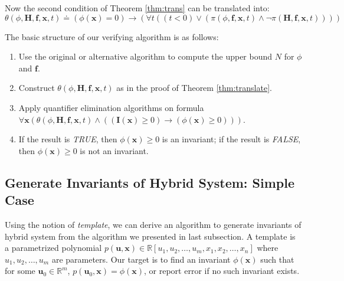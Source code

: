 \documentclass{article}
\begin{document}
\begin{Proof}
Now the second condition of Theorem \ref{thm:trans} can be translated into:
	\begin{equation*}
		\theta(\phi ,\boldsymbol{H}, \boldsymbol{f}, \boldsymbol{x}, t) \doteq (\phi(\boldsymbol{x}) = 0) \rightarrow (\forall t ((t < 0) \vee (\pi(\phi, \boldsymbol{f}, \boldsymbol{x}, t) \wedge \neg \pi(\boldsymbol{H}, \boldsymbol{f}, \boldsymbol{x}, t))))
	\end{equation*}
\end{Proof}

The basic structure of our verifying algorithm is as follows:
\begin{enumerate}
	\item Use the original or alternative algorithm to compute the upper bound $N$ for $\phi$ and $\boldsymbol{f}$.
	\item Construct $\theta(\phi ,\boldsymbol{H}, \boldsymbol{f}, \boldsymbol{x}, t)$ as in the proof of Theorem \ref{thm:translate}.
	\item Apply quantifier elimination algorithms on formula $\forall \boldsymbol{x} (\theta(\phi, \boldsymbol{H}, \boldsymbol{f}, \boldsymbol{x}, t) \wedge ((\boldsymbol{I}(\boldsymbol{x}) \geq 0) \rightarrow (\phi(\boldsymbol{x}) \geq 0)))$.
	\item If the result is \emph{TRUE}, then $\phi(\boldsymbol{x}) \geq 0$ is an invariant; if the result is \emph{FALSE}, then $\phi(\boldsymbol{x}) \geq 0$ is not an invariant.
\end{enumerate}

\subsection{Generate Invariants of Hybrid System: Simple Case}
Using the notion of \emph{template}, we can derive an algorithm to generate invariants of hybrid system from the algorithm we presented in last subsection. A template is a parametrized polynomial $p(\boldsymbol{u}, \boldsymbol{x}) \in \mathbb{R}[u_1, u_2, \dots, u_m, x_1, x_2, \dots, x_n]$ where $u_1, u_2, \dots, u_m$ are parameters. Our target is to find an invariant $\phi(\boldsymbol{x})$ such that for some $\boldsymbol{u}_0 \in \mathbb{R}^m$, $p(\boldsymbol{u}_0, \boldsymbol{x}) = \phi(\boldsymbol{x})$, or report error if no such invariant exists.
\end{document}
